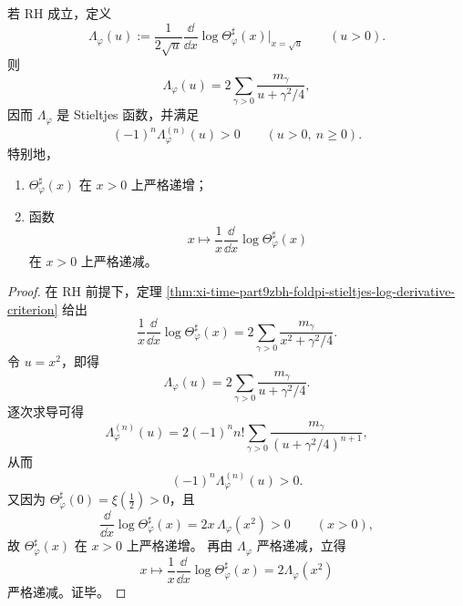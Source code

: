 \begin{corollary}\label{cor:xi-time-part9zbh-foldpi-completely-monotone-log-slope}
若 RH 成立，定义
\[
\Lambda_\varphi(u)
:=
\frac{1}{2\sqrt u}
\frac{\dd}{\dd x}\log \Theta_\varphi^\sharp(x)\Big|_{x=\sqrt u}
\qquad (u>0).
\]
则
\[
\Lambda_\varphi(u)
=
2\sum_{\gamma>0}\frac{m_\gamma}{u+\gamma^2/4},
\]
因而 \(\Lambda_\varphi\) 是 Stieltjes 函数，并满足
\[
(-1)^n\Lambda_\varphi^{(n)}(u)>0
\qquad (u>0,\ n\ge 0).
\]
特别地，
\begin{enumerate}
  \item \(\Theta_\varphi^\sharp(x)\) 在 \(x>0\) 上严格递增；
  \item 函数
  \[
  x\longmapsto \frac1x\frac{\dd}{\dd x}\log \Theta_\varphi^\sharp(x)
  \]
  在 \(x>0\) 上严格递减。
\end{enumerate}
\end{corollary}
\begin{proof}
在 RH 前提下，定理 \ref{thm:xi-time-part9zbh-foldpi-stieltjes-log-derivative-criterion} 给出
\[
\frac1x\frac{\dd}{\dd x}\log \Theta_\varphi^\sharp(x)
=
2\sum_{\gamma>0}\frac{m_\gamma}{x^2+\gamma^2/4}.
\]
令 \(u=x^2\)，即得
\[
\Lambda_\varphi(u)
=
2\sum_{\gamma>0}\frac{m_\gamma}{u+\gamma^2/4}.
\]
逐次求导可得
\[
\Lambda_\varphi^{(n)}(u)
=
2(-1)^n n!\sum_{\gamma>0}\frac{m_\gamma}{(u+\gamma^2/4)^{n+1}},
\]
从而
\[
(-1)^n\Lambda_\varphi^{(n)}(u)>0.
\]
又因为 \(\Theta_\varphi^\sharp(0)=\xi(\frac12)>0\)，且
\[
\frac{\dd}{\dd x}\log \Theta_\varphi^\sharp(x)
=
2x\,\Lambda_\varphi(x^2)>0
\qquad (x>0),
\]
故 \(\Theta_\varphi^\sharp(x)\) 在 \(x>0\) 上严格递增。
再由 \(\Lambda_\varphi\) 严格递减，立得
\[
x\longmapsto \frac1x\frac{\dd}{\dd x}\log \Theta_\varphi^\sharp(x)=2\Lambda_\varphi(x^2)
\]
严格递减。证毕。
\end{proof}

